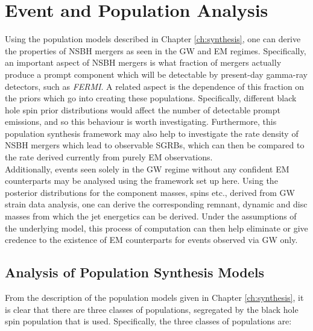 \chapter{Event and Population Analysis}\label{ch:analysis}

    Using the population models described in Chapter \ref{ch:synthesis}, one can derive
    the properties of NSBH mergers as seen in the GW and EM regimes.
    Specifically, an important aspect of NSBH mergers is what fraction of mergers
    actually produce a prompt component which will be detectable by present-day
    gamma-ray detectors, such as \textit{FERMI}. A related aspect is the dependence of this
    fraction on the priors which go into creating these populations. Specifically,
    different black hole spin prior distributions would affect the number of detectable
    prompt emissions, and so this behaviour is worth investigating. Furthermore, this
    population synthesis framework may also help to investigate the rate density of NSBH
    mergers which lead to observable SGRBs, which can then be compared to the rate
    derived currently from purely EM observations.\\
    Additionally, events seen solely in the GW regime without any confident EM
    counterparts may be analysed using the framework set up here. Using the posterior
    distributions for the component masses, spins etc., derived from GW strain data
    analysis, one can derive the corresponding remnant, dynamic and disc masses from
    which the jet energetics can be derived. Under the assumptions of the underlying
    model, this process of computation can then help eliminate or give credence to the
    existence of EM counterparts for events observed via GW only.

\section{Analysis of Population Synthesis Models}

    From the description of the population models given in Chapter \ref{ch:synthesis},
    it is clear that there are three classes of populations, segregated by the black
    hole spin population that is used. Specifically, the three classes of populations
    are:

